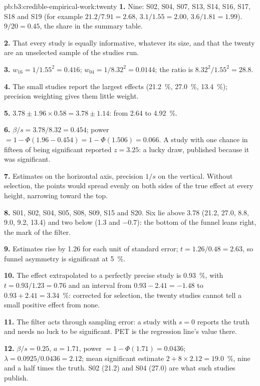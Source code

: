 \begin{solution}{pb:b3:credible-empirical-work:twenty}
\textbf{1.} Nine: S02, S04, S07, S13, S14, S16, S17, S18 and S19 (for example
$21.2/7.91 = 2.68$, $3.1/1.55 = 2.00$, $3.6/1.81 = 1.99$). $9/20 = 0.45$, the share
in the summary table. %

\textbf{2.} That every study is equally informative, whatever its size, and that
the twenty are an unselected sample of the studies run.

\textbf{3.} $w_{16} = 1/1.55^2 = 0.416$; $w_{04} = 1/8.32^2 = 0.0144$; the ratio is
$8.32^2/1.55^2 = 28.8$.

\textbf{4.} The small studies report the largest effects (21.2~\%, 27.0~\%,
13.4~\%); precision weighting gives them little weight.

\textbf{5.} $3.78 \pm 1.96 \times 0.58 = 3.78 \pm 1.14$: from 2.64 to 4.92~\%.

\textbf{6.} $\beta/s = 3.78/8.32 = 0.454$; power $= 1 - \Phi(1.96 - 0.454) = 1 -
\Phi(1.506) = 0.066$. A study with one chance in fifteen of being significant
reported $z = 3.25$: a lucky draw, published because it was significant.

\textbf{7.} Estimates on the horizontal axis, precision $1/s$ on the vertical.
Without selection, the points would spread evenly on both sides of the true
effect at every height, narrowing toward the top.

\textbf{8.} S01, S02, S04, S05, S08, S09, S15 and S20. Six lie above 3.78 (21.2, 27.0,
8.8, 9.0, 9.2, 13.4) and two below (1.3 and $-0.7$): the bottom of the funnel
leans right, the mark of the filter.

\textbf{9.} Estimates rise by 1.26 for each unit of standard error; $t = 1.26/0.48
= 2.63$, so funnel asymmetry is significant at 5~\%.

\textbf{10.} The effect extrapolated to a perfectly precise study is 0.93~\%,
with $t = 0.93/1.23 = 0.76$ and an interval from $0.93 - 2.41 = -1.48$ to $0.93 +
2.41 = 3.34$~\%: corrected for selection, the twenty studies cannot tell a small
positive effect from none.

\textbf{11.} The filter acts through sampling error: a study with $s = 0$ reports
the truth and needs no luck to be significant. PET is the regression line's value
there.

\textbf{12.} $\beta/s = 0.25$, $a = 1.71$, power $= 1 - \Phi(1.71) = 0.0436$;
$\lambda = 0.0925/0.0436 = 2.12$; mean significant estimate $2 + 8 \times 2.12 =
19.0$~\%, nine and a half times the truth. S02 (21.2) and S04 (27.0) are what such
studies publish.


\end{solution}
